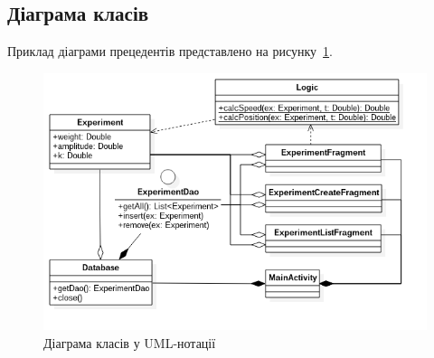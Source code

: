 \subsection{Діаграма класів}
Приклад діаграми прецедентів представлено на рисунку~\ref{fig:uml_class}.

\begin{figure}[H]
  \centering
    \includegraphics[width=1\textwidth]{uml_class}
  \caption{Діаграма класів у UML-нотації}
  \label{fig:uml_class}
\end{figure}



